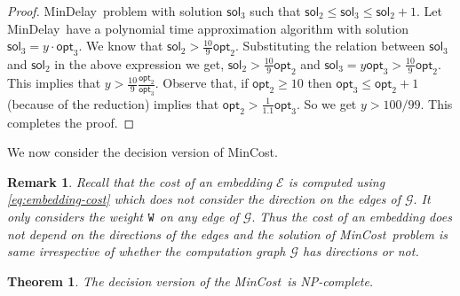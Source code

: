 \documentclass[journal]{IEEEtran}
\newtheorem{theorem}{{\bf Theorem}}
\newtheorem{remark}{{\bf Remark}}
\newcommand{\compgraph}{\mathcal{G}}
\newcommand{\mincost}{\textsf{MinCost}}
\newcommand{\mindelay}{\textsf{MinDelay}}
\newcommand{\embedding}{\mathcal{E}}
\begin{document}
\begin{proof}
  \mindelay\ problem with solution $\mathsf{sol}_3$ such that
  $\mathsf{sol}_2 \leq \mathsf{sol}_3 \leq \mathsf{sol}_2 +1.$ Let
  \mindelay\ have a polynomial time approximation algorithm with
  solution $\mathsf{sol}_3 = y \cdot \mathsf{opt}_3.$ We know that
  $\mathsf{sol}_2 > \frac{10}{9}\mathsf{opt}_2.$ Substituting the
  relation between $\mathsf{sol}_3$ and $\mathsf{sol}_2$ in the above
  expression we get, $ \mathsf{sol}_2 > \frac{10}{9}\mathsf{opt}_2$ and 
    $\mathsf{sol}_3 = y \mathsf{opt}_3 > \frac{10}{9}\mathsf{opt}_2.$ This implies that
    $y > \frac{10}{9} \frac{\mathsf{opt}_2}{\mathsf{opt}_3}.$
  Observe that, if $\mathsf{opt}_2 \geq 10$ then $\mathsf{opt}_3 \leq
  \mathsf{opt}_2 +1$ (because of the reduction) implies that
  $\mathsf{opt}_2 > \frac{1}{1.1}\mathsf{opt}_3.$ So we get $y >
  100/99.$ This completes the proof.
\end{proof}

We now consider the decision version of \mincost.

\begin{remark}
  \label{rm:directed}
  Recall that the cost of an embedding $\embedding$ is computed using
  \eqref{eq:embedding-cost} which does not consider the direction on
  the edges of $\compgraph.$ It only considers the weight $\mathtt{W}$ on
  any edge of $\compgraph.$ Thus the cost of an embedding does not
  depend on the directions of the edges and the solution of \mincost\
  problem is same irrespective of whether the computation graph
  $\compgraph$ has directions or not.
\end{remark}

\begin{theorem}
  \label{thm:mincost}
  The decision version of the \mincost\ is NP-complete.
\end{theorem}
\end{document}
